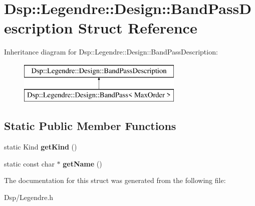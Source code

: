 \hypertarget{structDsp_1_1Legendre_1_1Design_1_1BandPassDescription}{\section{Dsp\-:\-:Legendre\-:\-:Design\-:\-:Band\-Pass\-Description Struct Reference}
\label{structDsp_1_1Legendre_1_1Design_1_1BandPassDescription}
}
Inheritance diagram for Dsp\-:\-:Legendre\-:\-:Design\-:\-:Band\-Pass\-Description\-:\begin{figure}[H]
\begin{center}
\leavevmode
\includegraphics[height=2.000000cm]{structDsp_1_1Legendre_1_1Design_1_1BandPassDescription}
\end{center}
\end{figure}
\subsection*{Static Public Member Functions}
\begin{DoxyCompactItemize}
\item 
\hypertarget{structDsp_1_1Legendre_1_1Design_1_1BandPassDescription_ad52f701f6b650b29dfc2e720e920cec8}{static Kind {\bfseries get\-Kind} ()}\label{structDsp_1_1Legendre_1_1Design_1_1BandPassDescription_ad52f701f6b650b29dfc2e720e920cec8}

\item 
\hypertarget{structDsp_1_1Legendre_1_1Design_1_1BandPassDescription_a6b34efd82066d9626bbc671f9d04f556}{static const char $\ast$ {\bfseries get\-Name} ()}\label{structDsp_1_1Legendre_1_1Design_1_1BandPassDescription_a6b34efd82066d9626bbc671f9d04f556}

\end{DoxyCompactItemize}


The documentation for this struct was generated from the following file\-:\begin{DoxyCompactItemize}
\item 
Dsp/Legendre.\-h\end{DoxyCompactItemize}
